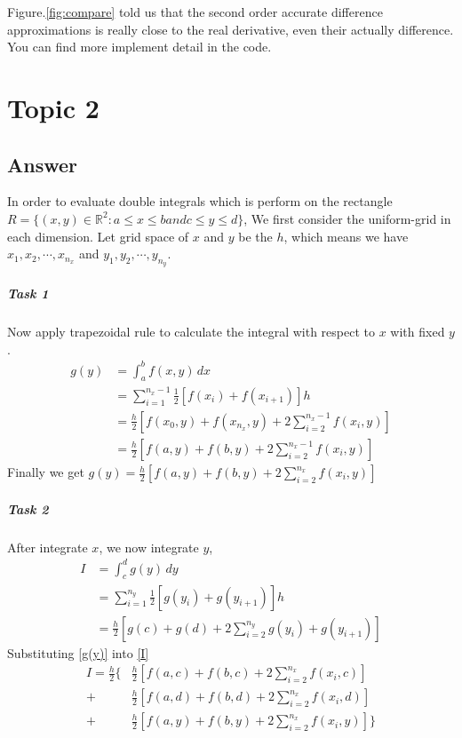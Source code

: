 \documentclass[
	12pt, %
]{fphw}
\begin{document}
Figure.\ref{fig:compare} told us that the second order accurate difference approximations is really close to the real derivative, even their actually difference. You can find more implement detail in the code. 

\section*{Topic 2}

\subsection*{Answer}

In order to evaluate double integrals which is perform on the rectangle $R = \{ (x, y) \in \mathbb{R}^2: a \leq x \leq b and c \leq y \leq d  \} $, We first consider the uniform-grid in each 
dimension. Let grid space of $x$ and $y$ be the $h$, which means we have $x_1, x_2, \cdots , x_{n_x}$ and $y_1, y_2, \cdots , y_{n_y}$.

\subparagraph*{Task 1}
Now  apply trapezoidal rule to calculate the integral with respect to $x$ with fixed $y$.
\[
\begin{aligned} \label{g(y)}
g(y) &= \int^{b}_{a}f(x,y)\,dx \\
	 &= \sum^{n_x-1}_{i=1}\frac{1}{2}[f(x_i)+f(x_{i+1})]h \\
	 &= \frac{h}{2} [f(x_0, y) + f(x_{n_x}, y) + 2\sum^{n_x-1}_{i=2}f(x_i, y)] \\
	 &= \frac{h}{2} [f(a, y) + f(b, y) + 2\sum^{n_x-1}_{i=2}f(x_i, y)] 
\end{aligned}
\]
Finally we get $g(y)=\frac{h}{2} [f(a, y) + f(b, y) + 2\sum^{n_x}_{i=2}f(x_i, y)]$

\subparagraph*{Task 2}
After integrate $x$, we now integrate $y$, 
\[
\begin{aligned} \label{I}
I &= \int^{d}_{c}g(y)\,dy \\
  &= \sum^{n_y}_{i=1}\frac{1}{2} [g(y_i)+g(y_{i+1})]h \\
  &= \frac{h}{2} [g(c) + g(d) + 2\sum^{n_y}_{i=2}g(y_i)+g(y_{i+1})]
\end{aligned}
\]
Substituting \ref{g(y)} into  \ref*{I}
\[
\begin{aligned}
I = \frac{h}{2}\{&\frac{h}{2}[f(a, c) + f(b, c) + 2\sum^{n_x}_{i=2}f(x_i, c)]	\\
	 			+&\frac{h}{2}[f(a, d) + f(b, d) + 2\sum^{n_x}_{i=2}f(x_i, d)]	\\
	 			+&\frac{h}{2}[f(a, y) + f(b, y) + 2\sum^{n_x}_{i=2}f(x_i, y)]\}	
\end{aligned}
\]
\end{document}
